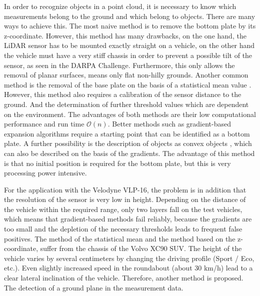 \documentclass[11pt,oneside,openright]{mpreport}
\begin{document}
In order to recognize objects in a point cloud, it is necessary to know which measurements belong to the ground and which belong to objects.
There are many ways to achieve this. The most naive method is to remove the bottom plate by its z-coordinate.
However, this method has many drawbacks, on the one hand, the LiDAR sensor has to be mounted exactly straight on a vehicle, 
on the other hand the vehicle must have a very stiff chassis in order to prevent a possible tilt of the sensor, as seen in the \ac{DARPA} Challenge.
Furthermore, this only allows the removal of planar surfaces, means only flat non-hilly grounds. 
Another common method is the removal of the base plate on the basis of a statistical mean value \cite{Zhang}.
However, this method also requires a calibration of the sensor distance to the ground. 
And the determination of further threshold values which are dependent on the environment.
The advantages of both methods are their low computational performance and run time $\mathcal{O}(n)$.
Better methods such as gradient-based expansion algorithms require a starting point that can be identified as a bottom plate.
A further possibility is the description of objects as convex objects \cite{5164280}, which can also be described on the basis of the gradients.
The advantage of this method is that no initial position is required for the bottom plate, but this is very processing power intensive.
% 

For the application with the Velodyne VLP-16, the problem is in addition that the resolution of the sensor is very low in height.
Depending on the distance of the vehicle within the required range, only two layers fall on the test vehicles, which means that gradient-based methods fail reliably,
because the gradients are too small and the depletion of the necessary thresholds leads to frequent false positives. 
The method of the statistical mean and the method based on the z-coordinate, suffer from the chassis of the Volvo XC90 SUV. 
The height of the vehicle varies by several centimeters by changing the driving profile (Sport / Eco, etc.). Even slightly increased speed in the roundabout (about 30 km/h)
lead to a clear lateral inclination of the vehicle. Therefore, another method is proposed. The detection of a ground plane in the measurement data.
\end{document}
